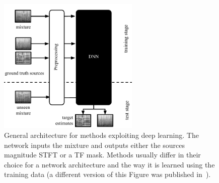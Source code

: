\begin{figure}
  \centering
  \includegraphics[width=0.6\textwidth]{Chapters/06_Separation_Unknown/figures/methods_dnn.pdf}
  \caption{General architecture for methods exploiting deep learning. The network inputs the mixture and outputs either the sources magnitude STFT or a TF mask. Methods usually differ in their choice for a network architecture and the way it is learned using the training data (a different version of this Figure was published in~\cite{rafii}).}
  \label{fig:methods_dnn}
\end{figure}

